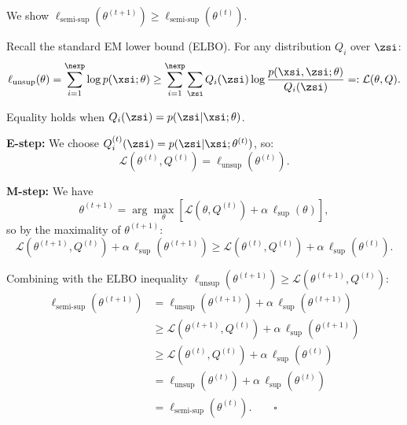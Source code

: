 \begin{answer}
We show $\ell_\text{semi-sup}(\theta^{(t+1)}) \geq \ell_\text{semi-sup}(\theta^{(t)})$.

Recall the standard EM lower bound (ELBO). For any distribution $Q_i$ over $\zsi$:
$$\ell_\text{unsup}(\theta) = \sum_{i=1}^\nexp \log p(\xsi;\theta) \geq \sum_{i=1}^\nexp \sum_{\zsi} Q_i(\zsi)\log\frac{p(\xsi,\zsi;\theta)}{Q_i(\zsi)} =: \mathcal{L}(\theta, Q).$$

Equality holds when $Q_i(\zsi) = p(\zsi|\xsi;\theta)$.

\textbf{E-step:} We choose $Q_i^{(t)}(\zsi) = p(\zsi|\xsi;\theta^{(t)})$, so:
$$\mathcal{L}(\theta^{(t)}, Q^{(t)}) = \ell_\text{unsup}(\theta^{(t)}).$$

\textbf{M-step:} We have
$$\theta^{(t+1)} = \arg\max_\theta \left[\mathcal{L}(\theta, Q^{(t)}) + \alpha\,\ell_\text{sup}(\theta)\right],$$
so by the maximality of $\theta^{(t+1)}$:
$$\mathcal{L}(\theta^{(t+1)}, Q^{(t)}) + \alpha\,\ell_\text{sup}(\theta^{(t+1)}) \geq \mathcal{L}(\theta^{(t)}, Q^{(t)}) + \alpha\,\ell_\text{sup}(\theta^{(t)}).$$

Combining with the ELBO inequality $\ell_\text{unsup}(\theta^{(t+1)}) \geq \mathcal{L}(\theta^{(t+1)}, Q^{(t)})$:
\begin{align*}
\ell_\text{semi-sup}(\theta^{(t+1)})
&= \ell_\text{unsup}(\theta^{(t+1)}) + \alpha\,\ell_\text{sup}(\theta^{(t+1)}) \\
&\geq \mathcal{L}(\theta^{(t+1)}, Q^{(t)}) + \alpha\,\ell_\text{sup}(\theta^{(t+1)}) \\
&\geq \mathcal{L}(\theta^{(t)}, Q^{(t)}) + \alpha\,\ell_\text{sup}(\theta^{(t)}) \\
&= \ell_\text{unsup}(\theta^{(t)}) + \alpha\,\ell_\text{sup}(\theta^{(t)}) \\
&= \ell_\text{semi-sup}(\theta^{(t)}). \qquad \square
\end{align*}
\end{answer}
